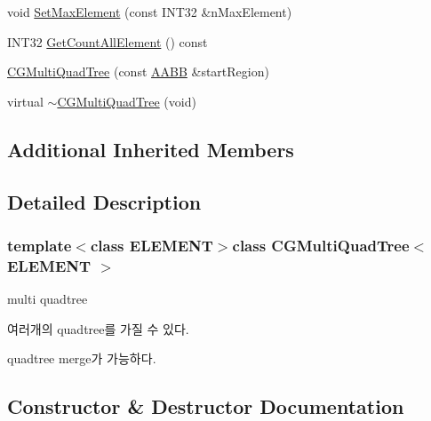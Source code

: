 \begin{DoxyCompactItemize}
\item 
void \hyperlink{class_c_g_multi_quad_tree_ad3d93626728c36f852f3d35a6aacfa1f}{Set\+Max\+Element} (const I\+N\+T32 \&n\+Max\+Element)
\item 
I\+N\+T32 \hyperlink{class_c_g_multi_quad_tree_a42595501abfe800a4d7afb415056afe5}{Get\+Count\+All\+Element} () const 
\item 
\hyperlink{class_c_g_multi_quad_tree_a3ef9602644ea3bddf6826ee1c5d39942}{C\+G\+Multi\+Quad\+Tree} (const \hyperlink{struct_a_a_b_b}{A\+A\+B\+B} \&start\+Region)
\item 
virtual \hyperlink{class_c_g_multi_quad_tree_a22ed86f5ae7905d1a27a692c2bde1872}{$\sim$\+C\+G\+Multi\+Quad\+Tree} (void)
\end{DoxyCompactItemize}
\subsection*{Additional Inherited Members}


\subsection{Detailed Description}
\subsubsection*{template$<$class E\+L\+E\+M\+E\+N\+T$>$class C\+G\+Multi\+Quad\+Tree$<$ E\+L\+E\+M\+E\+N\+T $>$}


\begin{DoxyItemize}
\item multi quadtree
\item 여러개의 quadtree를 가질 수 있다.
\item quadtree merge가 가능하다. 
\end{DoxyItemize}

\subsection{Constructor \& Destructor Documentation}
\hypertarget{class_c_g_multi_quad_tree_a3ef9602644ea3bddf6826ee1c5d39942}{}
